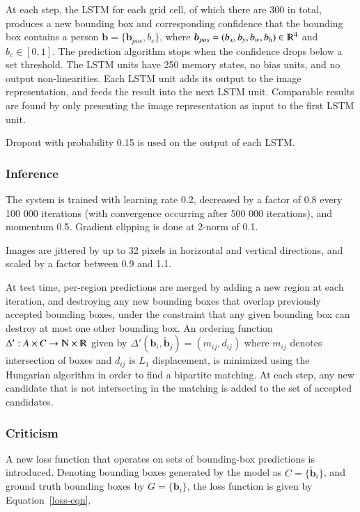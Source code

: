 \documentclass[a4paper, 12pt]{article}
\begin{document}
At each step, the LSTM for each grid cell, of which there are 300 in total,
produces a new bounding box and corresponding confidence that the bounding box
contains a person $\boldsymbol{b} = \{\boldsymbol{b}_{pos}, b_c\}$, where
$\boldsymbol{b}_{pos} = (b_x, b_y, b_w, b_h) \in \varmathbb{R}^4$ and
$b_c \in [0, 1]$. The prediction algorithm stops when the confidence drops
below a set threshold. The LSTM units have 250 memory states, no bias units,
and no output non-linearities. Each LSTM unit adds its output to the image
representation, and feeds the result into the next LSTM unit. Comparable
results are found by only presenting the image representation as input to the
first LSTM unit.

Dropout with probability 0.15 is used on the output of each LSTM\@.

\subsubsection{Inference}

The system is trained with learning rate 0.2, decreased by a factor of 0.8
every 100 000 iterations (with convergence occurring after 500 000 iterations),
and momentum 0.5. Gradient clipping is done at 2-norm of 0.1.

Images are jittered by up to 32 pixels in horizontal and vertical directions,
and scaled by a factor between 0.9 and 1.1.

At test time, per-region predictions are merged by adding a new region at each
iteration, and destroying any new bounding boxes that overlap previously
accepted bounding boxes, under the constraint that any given bounding box can
destroy at most one other bounding box. An ordering function
$\Delta': A \times C \rightarrow \varmathbb{N} \times \varmathbb{R}$ given by
$\Delta'(\boldsymbol{b}_i, \tilde{\boldsymbol{b}}_j) = (m_{ij}, d_{ij})$ where
$m_{ij}$ denotes intersection of boxes and $d_{ij}$ is $L_1$ displacement, is
minimized using the Hungarian algorithm in order to find a bipartite matching.
At each step, any new candidate that is not intersecting in the matching is
added to the set of accepted candidates.

\subsubsection{Criticism}

A new loss function that operates on sets of bounding-box predictions is
introduced. Denoting bounding boxes generated by the model as
$C = \{\tilde{\boldsymbol{b}}_i\}$, and ground truth bounding boxes by
$G = \{\boldsymbol{b}_i\}$, the loss function is given by
Equation~\ref{loss-eqn}.
\end{document}
